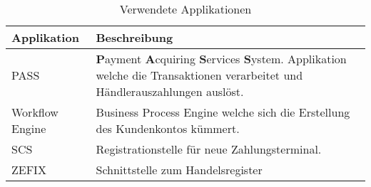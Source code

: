 \begin{table}[H]
	\centering
	\caption{Verwendete Applikationen}
	\label{tab:table1}
	\begin{tabular}{ | p{2cm} | p{14cm} | }
		\toprule
		{\textbf{Applikation}} & {\textbf{Beschreibung}} \\
		\midrule
		PASS & \textbf{P}ayment \textbf{A}cquiring \textbf{S}ervices \textbf{S}ystem. Applikation welche die Transaktionen verarbeitet und Händlerauszahlungen auslöst. \\ \hline
		Workflow Engine & Business Process Engine welche sich die Erstellung des Kundenkontos kümmert.\\ \hline
		SCS & Registrationstelle für neue Zahlungsterminal.\\ \hline
		ZEFIX & Schnittstelle zum Handelsregister\\
		\bottomrule
	\end{tabular}
\end{table}

